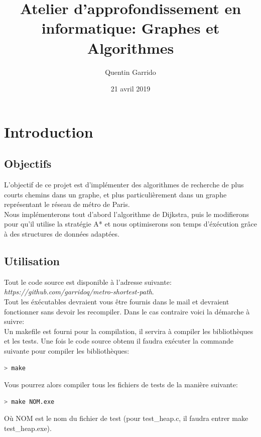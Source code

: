 \documentclass{article}
\title{Atelier d'approfondissement en informatique: Graphes et Algorithmes}
\author{Quentin Garrido}
\date{21 avril 2019}
\begin{document}
\maketitle
\tableofcontents
\pagebreak

\section{Introduction}
\subsection{Objectifs}

L'objectif de ce projet est d'implémenter des algorithmes de recherche de plus courts
chemins dans un graphe, et plus particulièrement dans un graphe représentant le réseau
de métro de Paris.\\
Nous implémenterons tout d'abord l'algorithme de Dijkstra, puis le modifierons pour
qu'il utilise la stratégie  A* et nous optimiserons son temps d'éxécution grâce
à des structures de données adaptées.

\subsection{Utilisation}

Tout le code source est disponible à l'adresse suivante: \textit{https://github.com/garridoq/metro-shortest-path}.\\

Tout les éxécutables devraient vous être fournis dans le mail et devraient fonctionner sans devoir
les recompiler. Dans le cas contraire voici la démarche à suivre:\\

Un makefile est fourni pour la compilation, il servira à compiler les bibliothèques et les tests.
Une fois le code source obtenu il faudra exécuter la commande suivante pour compiler les bibliothèques:
\begin{lstlisting}[language=bash]
	> make
\end{lstlisting}

Vous pourrez alors compiler tous les fichiers de tests de la manière suivante:
\begin{lstlisting}[language=bash]
	> make NOM.exe
\end{lstlisting}
Où NOM est le nom du fichier de test (pour test\_heap.c, il faudra entrer make test\_heap.exe).\\
\end{document}
